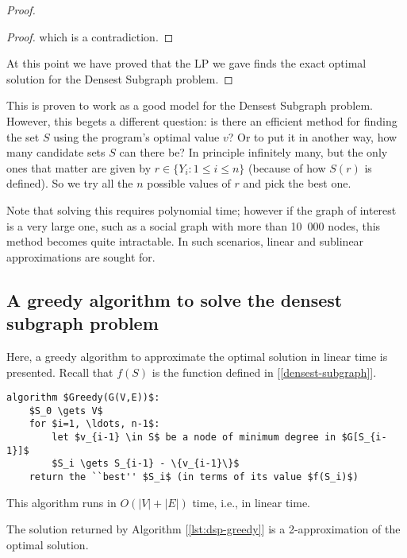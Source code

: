 \begin{proof}
\begin{proof}
        which is a contradiction.
    \end{proof}
    At this point we have proved that the LP we gave finds the exact optimal solution for the Densest Subgraph problem.
\end{proof}

This \lp{} is proven to work as a good model for the Densest Subgraph problem. However, this begets a different question: is there an efficient method for finding the set $S$ using the program's optimal value $v$? Or to put it in another way, how many candidate sets $S$ can there be? In principle infinitely many, but the only ones that matter are given by $r \in \{Y_i : 1 \leq i \leq n\}$ (because of how $S(r)$ is defined). So we try all the $n$ possible values of $r$ and pick the best one.

Note that solving this \lp{} requires polynomial time; however if the graph of interest is a very large one, such as a social graph with more than 10\ 000 nodes, this method becomes quite intractable. In such scenarios, linear and sublinear approximations are sought for.


\subsection{A greedy algorithm to solve the densest subgraph problem}\label{sec:dsp-greedy}

Here, a greedy algorithm to approximate the optimal solution in linear time is presented. Recall that $f(S)$ is the function defined in [\ref{densest-subgraph}].

\begin{lstlisting}[caption = {The Greedy algorithm to solve the densest subgraph problem}, label = {lst:dsp-greedy}]
algorithm $Greedy(G(V,E))$:
    $S_0 \gets V$
    for $i=1, \ldots, n-1$:
        let $v_{i-1} \in S$ be a node of minimum degree in $G[S_{i-1}]$
        $S_i \gets S_{i-1} - \{v_{i-1}\}$
    return the ``best'' $S_i$ (in terms of its value $f(S_i)$)
\end{lstlisting}

\begin{obs}
    This algorithm runs in $O(|V| + |E|)$ time, i.e., in linear time.
\end{obs}

\begin{thm}\label{thm:dsp-greedy}
    The solution returned by Algorithm [\ref{lst:dsp-greedy}] is a 2-approximation of the optimal solution.
\end{thm}

